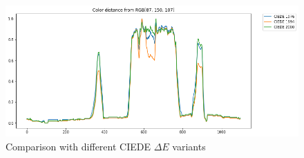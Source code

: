 \begin{figure}[htb]
	\includegraphics[width=\textwidth]{gfx/distances/ciede-comp.png}
	\caption{Comparison with different CIEDE $\Delta E$ variants}
	\label{fig:chroma:ciede_variants}
\end{figure}